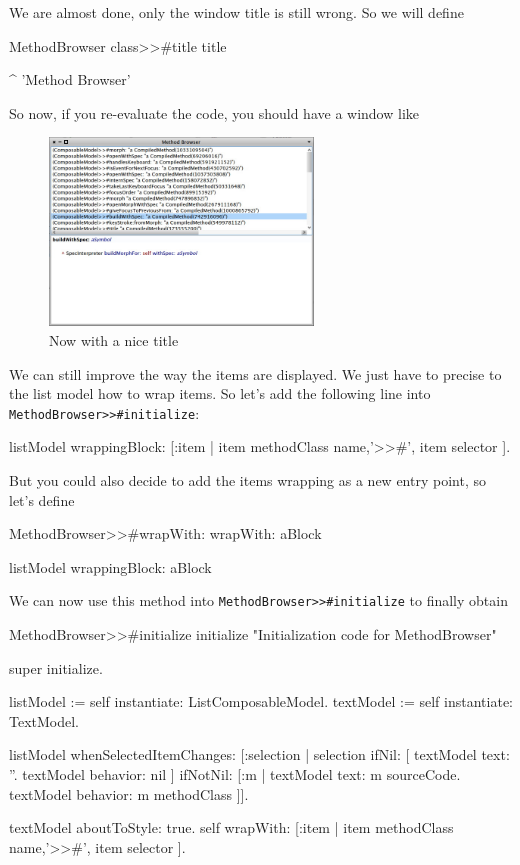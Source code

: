 \documentclass[a4paper,10pt,twoside]{book}
\begin{document}
We are almost done, only the window title is still wrong.
So we will define
%
\begin{method}{MethodBrowser class>>\#title}
title

	^ 'Method Browser'
\end{method}

So now, if you re-evaluate the code, you should have a window like 

\begin{figure}[ht]
\begin{center}
	\includegraphics[width=7cm]{MethodBrowser4}
	\caption{Now with a nice title}
\end{center}
\end{figure}

We can still improve the way the items are displayed. We just have to precise to the list model how to wrap items.
So let's add the following line into \verb+MethodBrowser>>#initialize+:
\begin{code}{}
listModel wrappingBlock: [:item | item methodClass name,'>>#', item selector ].
\end{code}

But you could also decide to add the items wrapping as a new entry point, so let's define 
\begin{method}{MethodBrowser>>\#wrapWith:}
wrapWith: aBlock

	listModel wrappingBlock: aBlock
\end{method}

We can now use this method into \verb+MethodBrowser>>#initialize+ to finally obtain
\begin{method}{MethodBrowser>>\#initialize}
initialize
	"Initialization code for MethodBrowser"

	super initialize.

	listModel := self instantiate: ListComposableModel.
	textModel := self instantiate: TextModel.
		
	listModel whenSelectedItemChanges: [:selection |
		selection
			ifNil: [
				textModel text: ''.
				textModel behavior: nil ]
			ifNotNil: [:m | 
				textModel text: m sourceCode.
				textModel behavior: m methodClass ]].
	
	textModel aboutToStyle: true.
	self wrapWith: [:item | item methodClass name,'>>#', item selector ].
\end{method}
\end{document}
